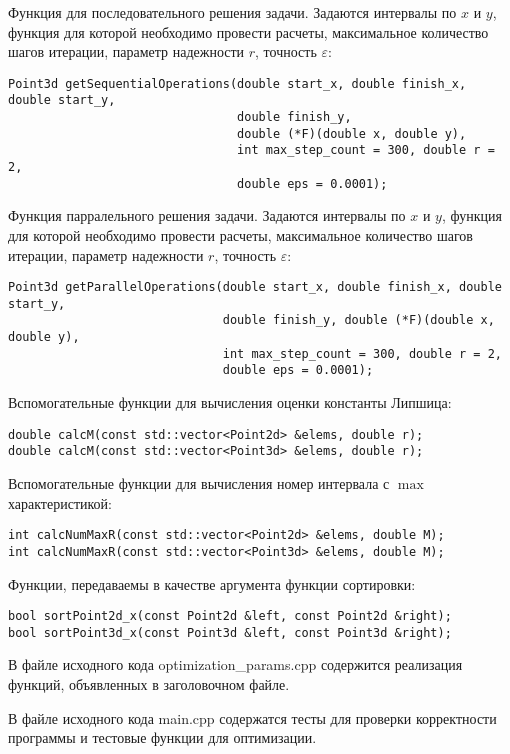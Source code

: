 \documentclass{report}
\begin{document}
\par Функция для последовательного решения задачи. Задаются интервалы по $x$ и $y$, функция для которой необходимо провести расчеты, максимальное количество шагов итерации, параметр надежности $r$, точность $\varepsilon$:
\begin{lstlisting}
Point3d getSequentialOperations(double start_x, double finish_x, double start_y,
								double finish_y,
								double (*F)(double x, double y),
								int max_step_count = 300, double r = 2,
								double eps = 0.0001);
\end{lstlisting}

\par Функция парралельного решения задачи. Задаются интервалы по $x$ и $y$, функция для которой необходимо провести расчеты, максимальное количество шагов итерации, параметр надежности $r$, точность $\varepsilon$:
\begin{lstlisting}
Point3d getParallelOperations(double start_x, double finish_x, double start_y,
							  double finish_y, double (*F)(double x, double y),
  							  int max_step_count = 300, double r = 2,
							  double eps = 0.0001);
\end{lstlisting}

\par Вспомогательные функции для вычисления оценки константы Липшица:
\begin{lstlisting} 
double calcM(const std::vector<Point2d> &elems, double r);
double calcM(const std::vector<Point3d> &elems, double r);
\end{lstlisting}
\par Вспомогательные функции для вычисления номер интервала с $\max$ характеристикой:
\begin{lstlisting}
int calcNumMaxR(const std::vector<Point2d> &elems, double M);
int calcNumMaxR(const std::vector<Point3d> &elems, double M);
\end{lstlisting}
\par Функции, передаваемы в качестве аргумента функции сортировки:
\begin{lstlisting}
bool sortPoint2d_x(const Point2d &left, const Point2d &right);
bool sortPoint3d_x(const Point3d &left, const Point3d &right);
\end{lstlisting}

\par В файле исходного кода optimization\_params.cpp содержится реализация функций,
объявленных в заголовочном файле.
\par В файле исходного кода main.cpp содержатся тесты для проверки корректности программы и тестовые функции для оптимизации.
\end{document}
